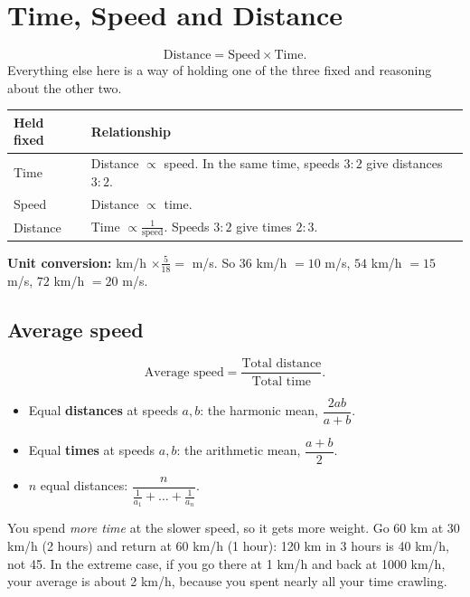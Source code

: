 \documentclass[11pt,a4paper,openany]{report}
\begin{document}
\chapter{Time, Speed and Distance}\label{ch:tsd}

\[\text{Distance}=\text{Speed}\times\text{Time}.\]
Everything else here is a way of holding one of the three fixed and reasoning about the other two.

\begin{idea}
\begin{center}
\begin{tabular}{ll}
\toprule
Held fixed & Relationship\\\midrule
Time & Distance $\propto$ speed. In the same time, speeds $3:2$ give distances $3:2$.\\
Speed & Distance $\propto$ time.\\
Distance & Time $\propto\frac1{\text{speed}}$. Speeds $3:2$ give times $2:3$.\\
\bottomrule
\end{tabular}
\end{center}
\textbf{Unit conversion:} km/h $\times\frac5{18}=$ m/s. So $36$ km/h $=10$ m/s, $54$ km/h $=15$ m/s, $72$ km/h $=20$ m/s.
\end{idea}

\section{Average speed}
\[\text{Average speed}=\frac{\text{Total distance}}{\text{Total time}}.\]
\begin{itemize}[nosep]
\item Equal \textbf{distances} at speeds $a,b$: the harmonic mean, $\dfrac{2ab}{a+b}$.
\item Equal \textbf{times} at speeds $a,b$: the arithmetic mean, $\dfrac{a+b}2$.
\item $n$ equal distances: $\dfrac{n}{\frac1{a_1}+\dots+\frac1{a_n}}$.
\end{itemize}
\begin{why}
You spend \emph{more time} at the slower speed, so it gets more weight. Go 60 km at 30 km/h (2 hours) and return at 60 km/h (1 hour): 120 km in 3 hours is 40 km/h, not 45. In the extreme case, if you go there at 1 km/h and back at 1000 km/h, your average is about 2 km/h, because you spent nearly all your time crawling.
\end{why}
\end{document}
